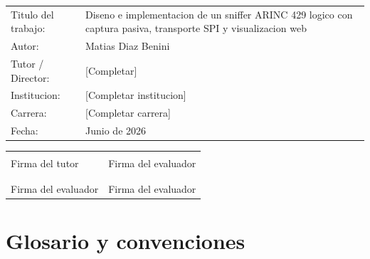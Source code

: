 \documentclass[12pt,a4paper,oneside]{report}
\newcommand{\titulo}{Diseno e implementacion de un sniffer ARINC 429 logico con captura pasiva, transporte SPI y visualizacion web}
\newcommand{\autor}{Matias Diaz Benini}
\newcommand{\director}{[Completar]}
\newcommand{\institucion}{[Completar institucion]}
\newcommand{\carrera}{[Completar carrera]}
\newcommand{\fechaentrega}{Junio de 2026}
\begin{document}
\vspace{1cm}
\begin{center}
\begin{tabular}{p{}p{}}
  Titulo del trabajo: & \titulo \\
  Autor: & \autor \\
  Tutor / Director: & \director \\
  Institucion: & \institucion \\
  Carrera: & \carrera \\
  Fecha: & \fechaentrega \\
\end{tabular}
\end{center}

\vspace{2.5cm}
\begin{center}
\begin{tabular}{p{}p{}}
  \hrulefill & \hrulefill \\
  Firma del tutor & Firma del evaluador \\
  \\[1.2cm]
  \hrulefill & \hrulefill \\
  Firma del evaluador & Firma del evaluador \\
\end{tabular}
\end{center}

\tableofcontents
\listoffigures
\listoftables

\chapter*{Glosario y convenciones}
\end{document}
